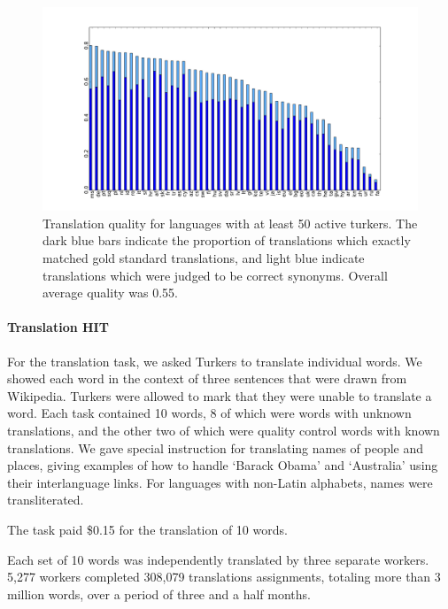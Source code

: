 \documentclass[11pt]{article}
\begin{document}
\begin{figure}[h]
\includegraphics[width=\linewidth]{final-figures/google-match-bar}
\caption{Translation quality for languages with at least 50 active turkers.  The dark blue bars indicate the proportion of translations which exactly matched gold standard translations, and light blue indicate translations which were judged to be correct synonyms.  Overall average quality was 0.55.}
\label{hitlangqual}
\end{figure}



\paragraph{Translation HIT}

For the translation task, we asked Turkers to translate individual words.  We showed each word in the context of three sentences that were drawn from Wikipedia.  
Turkers were allowed to mark that they were unable to translate a word. Each task contained 10 words, 8 of which were words with unknown translations, and the other two of which were quality control words with known translations.   
We gave special instruction for translating names of people and places, giving examples of how to handle `Barack Obama' and `Australia' using their interlanguage links. For languages with non-Latin alphabets, names were transliterated. 

The task paid \$0.15 for the translation of 10 words.  

Each set of 10 words was independently translated by three separate workers.  5,277 workers completed 308,079 translations assignments, totaling more than 3 million words, over a period of three and a half months.
\end{document}
